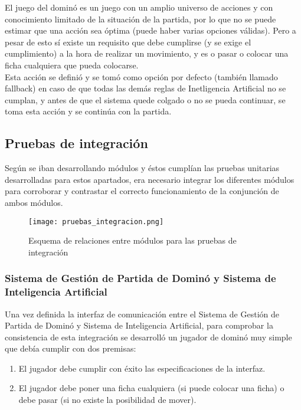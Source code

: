 El juego del dominó es un juego con un amplio universo de acciones y con conocimiento limitado de la situación de la partida,
por lo que no se puede estimar que una acción sea óptima (puede haber varias opciones válidas). Pero a pesar de esto sí existe
un requisito que debe cumplirse (y se exige el cumplimiento) a la hora de realizar un movimiento, y es o pasar o colocar una
ficha cualquiera que pueda colocarse. \\

Esta acción se definió y se tomó como opción por defecto (también llamado fallback) en caso de que todas las demás reglas
de Inetligencia Artificial no se cumplan, y antes de que el sistema quede colgado o no se pueda continuar, se toma esta acción y se continúa
con la partida.


\subsection{Pruebas de integración}

Según se iban desarrollando módulos y éstos cumplían las pruebas unitarias desarrolladas para estos apartados, era necesario
integrar los diferentes módulos para corroborar y contrastar el correcto funcionamiento de la conjunción de ambos módulos.

\begin{figure}[h]
  \begin{center}
    \texttt{[image: pruebas\_integracion.png]}
  \end{center}
  \caption{Esquema de relaciones entre módulos para las pruebas de integración}
  \label{pruebas_integracion}
\end{figure}

\subsubsection{Sistema de Gestión de Partida de Dominó y Sistema de Inteligencia Artificial}

Una vez definida la interfaz de comunicación entre el Sistema de Gestión de Partida de Dominó y Sistema de Inteligencia
Artificial, para comprobar la consistencia de esta integración se desarrolló un jugador de dominó muy simple que debía
cumplir con dos premisas:

\begin{enumerate}
    \item El jugador debe cumplir con éxito las especificaciones de la interfaz.
    \item El jugador debe poner una ficha cualquiera (si puede colocar una ficha) o debe pasar (si no existe la posibilidad
            de mover).
\end{enumerate}

